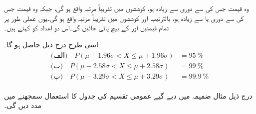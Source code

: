 وہ قیمت جس کی  سے دوری   سے زیادہ ہو،  کوششوں میں تقریباً    مرتبہ واقع ہو گی، جبکہ  وہ قیمت جس کی  سے دوری  یا   سے زیادہ ہو، بالترتیب   اور  کوششوں  میں تقریباً    مرتبہ واقع ہو گی۔یوں عملی طور پر تمام قیمتیں  اور  کے بیچ پائی جائیں گی۔اس دو اعداد کو  کہتے ہیں۔

اسی طرح درج ذیل حاصل ہو گا۔
\begin{gather}
\begin{aligned}
\text{(الف)}\quad P(\mu-1.96\sigma<X\le \mu+1.96\sigma)&=\SI{95}{\percent}\\
\text{(ب)}\quad P(\mu-2.58\sigma<X\le \mu+2.58\sigma)&=\SI{99}{\percent}\\
\text{(پ)}\quad P(\mu-3.29\sigma<X\le \mu+3.29\sigma)&=\SI{99.9}{\percent}
\end{aligned}
\end{gather}

درج ذیل مثال ضمیمہ  میں دیے گیے عمومی تقسیم کی جدول کا استعمال سمجھنے میں مدد دیں گی۔

